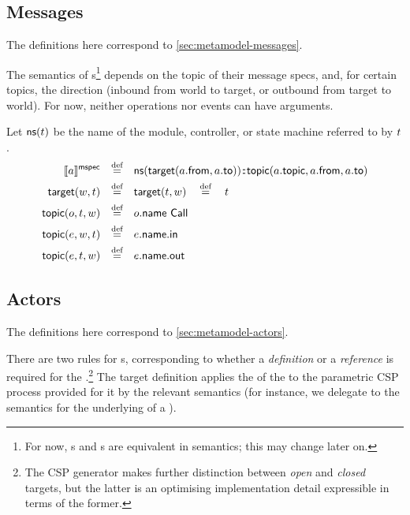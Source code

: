 \subsection{Messages}\label{ssec:semantics-tockcsp-messages}

The definitions here correspond to \cref{sec:metamodel-messages}.

\begin{defn}[\mmessagespec]

The semantics of \mmessagespec s\footnote{For now, \mgapmessagespec s and
\marrowmessagespec s are equivalent in semantics; this may change later on.}
depends on the topic of their message specs,
and, for certain topics, the direction (inbound from world to target, or
outbound from target to world).  For now, neither operations nor events can have
arguments.

\newcommand{\nsOf}[1]{\mathsf{ns}(#1)}
\newcommand{\targetOf}[2]{\mathsf{target}(#1,#2)}
\newcommand{\topicOf}[3]{\mathsf{topic}(#1,#2,#3)}

Let \(\nsOf{\atarget}\) be the name of the module, controller, or state machine
referred to by \(t\).
%
\begin{align*}
	\mspecsema{\anarrow}
\quad\defeq\quad&
	\nsOf{\targetOf{\field{\anarrow}{from}}{\field{\anarrow}{to}}}
	\cspnsop
	\topicOf{\field{\anarrow}{topic}}{\field{\anarrow}{from}}{\field{\anarrow}{to}}
\\
	\targetOf{\aworld}{\atarget}
\quad\defeq\quad&
	\targetOf{\atarget}{\aworld}
	\quad\defeq\quad
	\atarget
\\
	\topicOf{\anop}{\atarget}{\aworld}
\quad\defeq\quad&
	\field{\anop}{name}\ \mathsf{Call}
\\
	\topicOf{\anevent}{\aworld}{\atarget}
\quad\defeq\quad&
	\field{\anevent}{name}.\mathsf{in}
\\
	\topicOf{\anevent}{\atarget}{\aworld}
\quad\defeq\quad&
	\field{\anevent}{name}.\mathsf{out}
\end{align*}

\end{defn}

\subsection{Actors}

The definitions here correspond to \cref{sec:metamodel-actors}.

There are two rules for \mtarget{}s, corresponding to whether a
\emph{definition} or a \emph{reference} is required for the
\mtarget.\footnote{The CSP generator makes further distinction between
\emph{open} and \emph{closed} targets, but the latter is an optimising
implementation detail expressible in terms of the former.}
The target definition applies the \mtargetinstantiation{} of the \mtarget{}
to the parametric CSP process provided for it by the relevant semantics
(for instance, we delegate to the \robochart{} semantics for the underlying
\mrcmodule{} of a \mrcmoduletarget).

